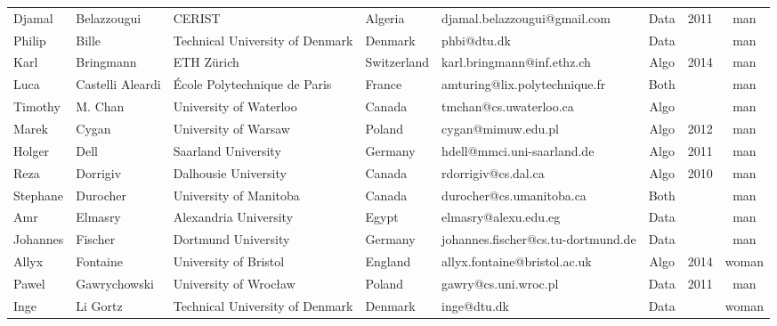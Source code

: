 \documentclass[a4paper,10pt]{article}
\begin{document}
{\begin{tabular}{@{}l@{\hspace{0.215cm}}l@{\hspace{0.215cm}}l@{\hspace{0.215cm}}l@{\hspace{0.215cm}}l@{\hspace{0.215cm}}c@{\hspace{0.215cm}}c@{\hspace{0.215cm}}c@{}}
Djamal       & Belazzougui      & CERIST                                   & Algeria     & djamal.belazzougui@gmail.com       & Data      & 2011     & man   \\
Philip       & Bille            & Technical University of Denmark          & Denmark     & phbi@dtu.dk                        & Data      &          & man   \\
Karl         & Bringmann        & ETH Zürich                               & Switzerland & karl.bringmann@inf.ethz.ch         & Algo      & 2014     & man   \\
Luca         & Castelli Aleardi & \'Ecole Polytechnique de Paris           & France      & amturing@lix.polytechnique.fr      & Both &          & man   \\
Timothy      & M. Chan          & University of Waterloo                   & Canada      & tmchan@cs.uwaterloo.ca             & Algo      &          & man   \\
Marek        & Cygan            & University of Warsaw                     & Poland      & cygan@mimuw.edu.pl                 & Algo      & 2012     & man   \\
Holger       & Dell             & Saarland University                      & Germany     & hdell@mmci.uni-saarland.de         & Algo      & 2011     & man   \\
Reza         & Dorrigiv         & Dalhousie University                     & Canada      & rdorrigiv@cs.dal.ca                & Algo      & 2010     & man   \\
Stephane     & Durocher         & University of Manitoba                   & Canada      & durocher@cs.umanitoba.ca           & Both &          & man   \\
  Amr        & Elmasry          & Alexandria University                    & Egypt       & elmasry@alexu.edu.eg               & Data      &          & man   \\
Johannes     & Fischer          & Dortmund University                      & Germany     & johannes.fischer@cs.tu-dortmund.de & Data      &          & man   \\
Allyx        & Fontaine         & University of Bristol                    & England     & allyx.fontaine@bristol.ac.uk       & Algo      & 2014     & woman \\
Pawel        & Gawrychowski     & University of Wrocław                    & Poland      & gawry@cs.uni.wroc.pl               & Data      & 2011     & man   \\
Inge         & Li Gortz         & Technical University of Denmark          & Denmark     & inge@dtu.dk                        & Data      &          & woman \\

\end{tabular}}
\end{document}
